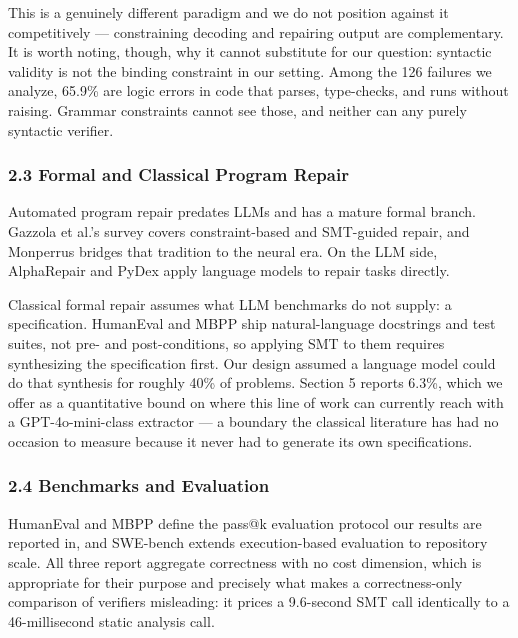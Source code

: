 This is a genuinely different paradigm and we do not position against it competitively --- constraining decoding and repairing output are complementary. It is worth noting, though, why it cannot substitute for our question: syntactic validity is not the binding constraint in our setting. Among the 126 failures we analyze, 65.9\% are logic errors in code that parses, type-checks, and runs without raising. Grammar constraints cannot see those, and neither can any purely syntactic verifier.

\subsubsection{2.3 Formal and Classical Program Repair}

Automated program repair predates LLMs and has a mature formal branch. Gazzola et al.'s survey \citep{Gazzola2019Survey} covers constraint-based and SMT-guided repair, and Monperrus \citep{Monperrus2023Introduction} bridges that tradition to the neural era. On the LLM side, AlphaRepair \citep{Xia2022AlphaRepair} and PyDex \citep{Zhang2023PyDex} apply language models to repair tasks directly.

Classical formal repair assumes what LLM benchmarks do not supply: a specification. HumanEval and MBPP ship natural-language docstrings and test suites, not pre- and post-conditions, so applying SMT to them requires synthesizing the specification first. Our design assumed a language model could do that synthesis for roughly 40\% of problems. Section 5 reports 6.3\%, which we offer as a quantitative bound on where this line of work can currently reach with a GPT-4o-mini-class extractor --- a boundary the classical literature has had no occasion to measure because it never had to generate its own specifications.

\subsubsection{2.4 Benchmarks and Evaluation}

HumanEval \citep{Chen2021Evaluating} and MBPP \citep{Austin2021Program} define the pass@k evaluation protocol our results are reported in, and SWE-bench \citep{Jimenez2023SWEbench} extends execution-based evaluation to repository scale. All three report aggregate correctness with no cost dimension, which is appropriate for their purpose and precisely what makes a correctness-only comparison of verifiers misleading: it prices a 9.6-second SMT call identically to a 46-millisecond static analysis call.

